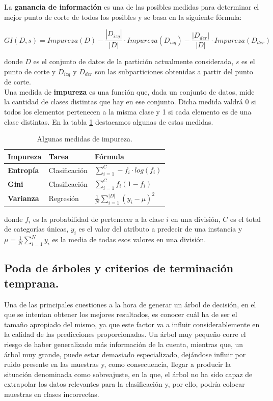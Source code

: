 La \textbf{ganancia de información} es una de las posibles medidas para determinar el mejor punto de corte de todos los posibles y se basa en la siguiente fórmula:

$$
GI(D,s) = Impureza(D) - \frac{|D_{izq}|}{|D|} \cdot Impureza(D_{izq}) - \frac{|D_{der}|}{|D|} \cdot Impureza(D_{der})
$$

donde $D$ es el conjunto de datos de la partición actualmente considerada, $s$ es el punto de corte y $D_{izq}$ y $D_{der}$ son las subparticiones obtenidas a partir del punto de corte.\\

Una medida de \textbf{impureza} \cite{impurity} es una función que, dada un conjunto de datos, mide la cantidad de clases distintas que hay en ese conjunto. Dicha medida valdrá 0 si todos los elementos pertenecen a la misma clase y 1 si cada elemento es de una clase distintas. En la tabla \ref{tab:entropy} destacamos algunas de estas medidas.\\

\begin{table}[ht]
\centering
\begin{tabular}{|l|l|l|}
\hline
\textbf{Impureza} & \textbf{Tarea} & \textbf{Fórmula}                         \\ \hline
\textbf{Entropía}  & Clasificación  & $\sum_{i=1}^{C}- f_i \cdot log (f_i)$    \\ \hline
\textbf{Gini}      & Clasificación  & $\sum_{i=1}^{C} f_i (1 - f_i)$           \\ \hline
\textbf{Varianza}  & Regresión      & $\frac{1}{N}\sum_{i=1}^|D|(y_i - \mu)^2$ \\ \hline
\end{tabular}
\caption{Algunas medidas de impureza.}
\label{tab:entropy}
\end{table}

donde $f_i$ es la probabilidad de pertenecer a la clase $i$ en una división, $C$ es el total de categorías únicas, $y_i$ es el valor del atributo a predecir de una instancia  y $\mu = \frac{1}{N} \sum_{i=1}^{N}y_i$ es la media de todas esos valores en una división.\\
\subsection{Poda de árboles y criterios de terminación temprana.}
Una de las principales cuestiones a la hora de generar un árbol de decisión, en el que se intentan obtener los mejores resultados, es conocer cuál ha de ser el tamaño apropiado del mismo, ya que este factor va a influir considerablemente en la calidad de las predicciones proporcionadas. Un árbol muy pequeño corre el riesgo de haber generalizado más información de la cuenta, mientras que, un árbol muy grande, puede estar demasiado especializado, dejándose influir por ruido presente en las muestras y, como consecuencia, llegar a producir la situación denominada como sobreajuste, en la que, el árbol no ha sido capaz de extrapolar los datos relevantes para la clasificación y, por ello, podría colocar muestras en clases incorrectas.\\

